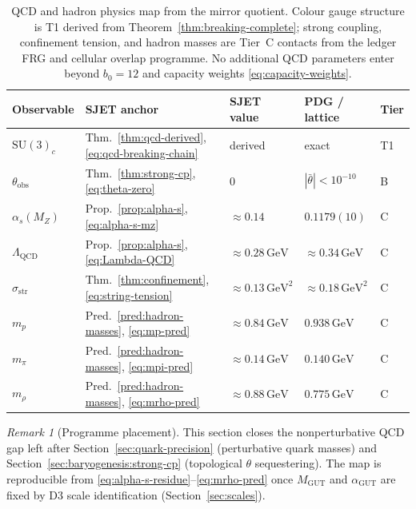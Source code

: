 \documentclass[aps,prd,onecolumn,amsmath,amssymb,nofootinbib,11pt]{revtex4-2}
\numberwithin{equation}{section}
\theoremstyle{plain}
\theoremstyle{definition}
\theoremstyle{remark}
\newtheorem{remark}[theorem]{Remark}
\begin{document}
\begin{table}[ht]
\centering
\small
\renewcommand{\arraystretch}{1.14}
\begin{tabular}{@{}lllll@{}}
\toprule
\textbf{Observable} & \textbf{SJET anchor} & \textbf{SJET value} &
\textbf{PDG / lattice} & \textbf{Tier} \\
\midrule
$\mathrm{SU}(3)_c$ &
  Thm.~\ref{thm:qcd-derived}, \eqref{eq:qcd-breaking-chain} &
  derived &
  exact &
  T1 \\
$\theta_{\mathrm{obs}}$ &
  Thm.~\ref{thm:strong-cp}, \eqref{eq:theta-zero} &
  $0$ &
  $|\bar\theta|<10^{-10}$ &
  B \\
$\alpha_s(M_Z)$ &
  Prop.~\ref{prop:alpha-s}, \eqref{eq:alpha-s-mz} &
  $\approx 0.14$ &
  $0.1179(10)$ &
  C \\
$\Lambda_{\mathrm{QCD}}$ &
  Prop.~\ref{prop:alpha-s}, \eqref{eq:Lambda-QCD} &
  $\approx 0.28\,\mathrm{GeV}$ &
  $\approx 0.34\,\mathrm{GeV}$ &
  C \\
$\sigma_{\mathrm{str}}$ &
  Thm.~\ref{thm:confinement}, \eqref{eq:string-tension} &
  $\approx 0.13\,\mathrm{GeV}^2$ &
  $\approx 0.18\,\mathrm{GeV}^2$ &
  C \\
$m_p$ &
  Pred.~\ref{pred:hadron-masses}, \eqref{eq:mp-pred} &
  $\approx 0.84\,\mathrm{GeV}$ &
  $0.938\,\mathrm{GeV}$ &
  C \\
$m_\pi$ &
  Pred.~\ref{pred:hadron-masses}, \eqref{eq:mpi-pred} &
  $\approx 0.14\,\mathrm{GeV}$ &
  $0.140\,\mathrm{GeV}$ &
  C \\
$m_\rho$ &
  Pred.~\ref{pred:hadron-masses}, \eqref{eq:mrho-pred} &
  $\approx 0.88\,\mathrm{GeV}$ &
  $0.775\,\mathrm{GeV}$ &
  C \\
\bottomrule
\end{tabular}
\caption{QCD and hadron physics map from the mirror quotient. Colour gauge
structure is T1 derived from Theorem~\ref{thm:breaking-complete}; strong
coupling, confinement tension, and hadron masses are Tier~C contacts from
the ledger FRG and cellular overlap programme. No additional QCD parameters
enter beyond $b_0=12$ and capacity weights
\eqref{eq:capacity-weights}.}
\label{tab:qcd-map}
\end{table}

\begin{remark}[Programme placement]
This section closes the nonperturbative QCD gap left after
Section~\ref{sec:quark-precision} (perturbative quark masses) and
Section~\ref{sec:baryogenesis:strong-cp} (topological $\theta$ sequestering).
The map is reproducible from \eqref{eq:alpha-s-residue}--\eqref{eq:mrho-pred}
once $M_{\mathrm{GUT}}$ and $\alpha_{\mathrm{GUT}}$ are fixed by D3 scale
identification (Section~\ref{sec:scales}).
\end{remark}%
\end{document}
